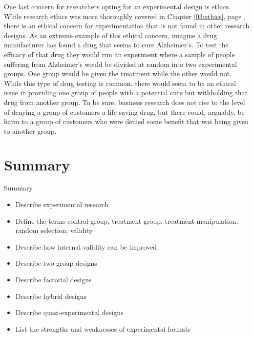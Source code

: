 One last concern for researchers opting for an experimental design is ethics. While research ethics was more thoroughly covered in Chapter \ref{03:ethics}, page \pageref{03:ethics}, there is an ethical concern for experimentation that is not found in other research designs. As an extreme example of this ethical concern, imagine a drug manufacturer has found a drug that seems to cure Alzheimer's. To test the efficacy of that drug they would run an experiment where a sample of people suffering from Alzheimer's would be divided at random into two experimental groups. One group would be given the treatment while the other would not. While this type of drug testing is common, there would seem to be an ethical issue in providing one group of people with a potential cure but withholding that drug from another group. To be sure, business research does not rise to the level of denying a group of customers a life-saving drug, but there could, arguably, be harm to a group of customers who were denied some benefit that was being given to another group.

\section{Summary}\label{ch09:summary}

\begin{center}
	\begin{tkawybox}{Summary}
		\begin{itemize}
			\setlength{\itemsep}{0pt}
			\setlength{\parskip}{0pt}
			\setlength{\parsep}{0pt}
			
			\item Describe experimental research
			\item Define the terms control group, treatment group, treatment manipulation, random selection, validity
			\item Describe how internal validity can be improved
			\item Describe two-group designs
			\item Describe factorial designs
			\item Describe hybrid designs
			\item Describe quasi-experimental designs
			\item List the strengths and weaknesses of experimental formats
			
		\end{itemize}
	\end{tkawybox}
\end{center}

